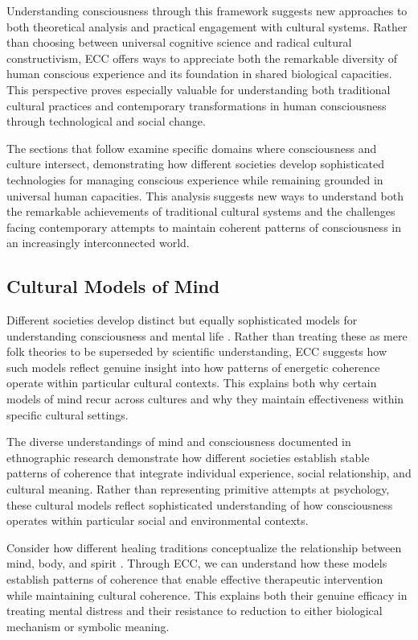 Understanding consciousness through this framework suggests new approaches to both theoretical analysis and practical engagement with cultural systems. Rather than choosing between universal cognitive science and radical cultural constructivism, ECC offers ways to appreciate both the remarkable diversity of human conscious experience and its foundation in shared biological capacities. This perspective proves especially valuable for understanding both traditional cultural practices and contemporary transformations in human consciousness through technological and social change.

The sections that follow examine specific domains where consciousness and culture intersect, demonstrating how different societies develop sophisticated technologies for managing conscious experience while remaining grounded in universal human capacities. This analysis suggests new ways to understand both the remarkable achievements of traditional cultural systems and the challenges facing contemporary attempts to maintain coherent patterns of consciousness in an increasingly interconnected world.

\subsection{Cultural Models of Mind}

Different societies develop distinct but equally sophisticated models for understanding consciousness and mental life \cite{luhrmann2012when}. Rather than treating these as mere folk theories to be superseded by scientific understanding, ECC suggests how such models reflect genuine insight into how patterns of energetic coherence operate within particular cultural contexts. This explains both why certain models of mind recur across cultures and why they maintain effectiveness within specific cultural settings.

The diverse understandings of mind and consciousness documented in ethnographic research \cite{hollan2000constructivist} demonstrate how different societies establish stable patterns of coherence that integrate individual experience, social relationship, and cultural meaning. Rather than representing primitive attempts at psychology, these cultural models reflect sophisticated understanding of how consciousness operates within particular social and environmental contexts.

Consider how different healing traditions conceptualize the relationship between mind, body, and spirit \cite{csordas1994sacred}. Through ECC, we can understand how these models establish patterns of coherence that enable effective therapeutic intervention while maintaining cultural coherence. This explains both their genuine efficacy in treating mental distress and their resistance to reduction to either biological mechanism or symbolic meaning.

